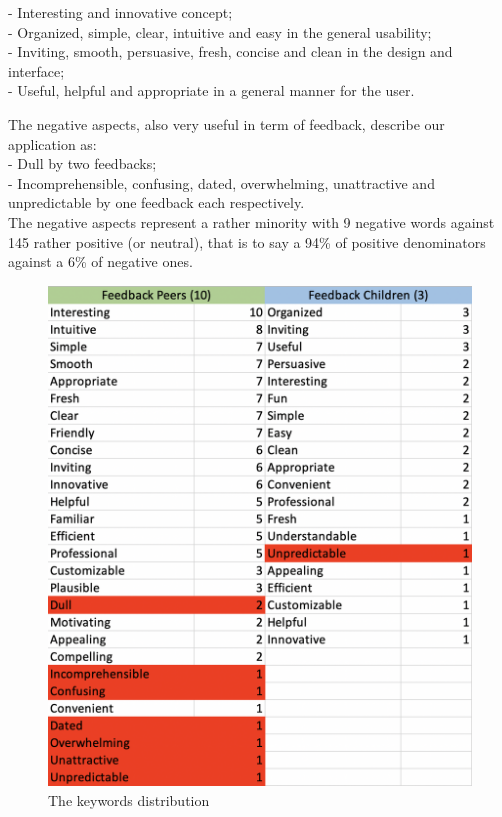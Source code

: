 \documentclass[12pt]{scrartcl}
\begin{document}
		- Interesting and innovative concept;\\
		
		- Organized, simple, clear, intuitive and easy in the general usability;\\
		
		- Inviting, smooth, persuasive, fresh, concise and clean in the design and interface;\\
		
		- Useful, helpful and appropriate in a general manner for the user.\\
		\newline		

	The negative aspects, also very useful in term of feedback, describe our application as:\\
	
		- Dull by two feedbacks;\\
		
		- Incomprehensible, confusing, dated, overwhelming, unattractive and unpredictable by one feedback each respectively.\\

	The negative aspects represent a rather minority with 9 negative words against 145 rather positive (or neutral), that is to say a 94\% of positive denominators against a 6\% of negative ones. 


	\begin{figure}[H]
		\centering
		\includegraphics[width=\textwidth]{../images/gary_GA6_image_words_analysis.png}
		\caption{The keywords distribution}
		\label{words}
	\end{figure}
\end{document}
